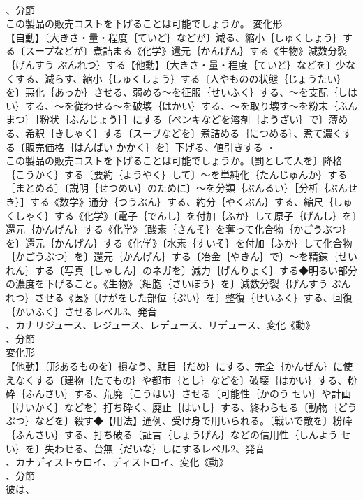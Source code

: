 \documentclass[8pt]{extreport}
\begin{document}
\begin{CJK}{UTF8}{min}
\\	、分節
\\	この製品の販売コストを下げることは可能でしょうか。	変化形 
\\	【自動】〔大きさ・量・程度｛ていど｝などが〕減る、縮小｛しゅくしょう｝する〔スープなどが〕煮詰まる《化学》還元｛かんげん｝する《生物》減数分裂｛げんすう ぶんれつ｝する【他動】〔大きさ・量・程度｛ていど｝などを〕少なくする、減らす、縮小｛しゅくしょう｝する〔人やものの状態｛じょうたい｝を〕悪化｛あっか｝させる、弱める～を征服｛せいふく｝する、～を支配｛しはい｝する、～を従わせる～を破壊｛はかい｝する、～を取り壊す～を粉末｛ふんまつ｝［粉状｛ふんじょう｝］にする〔ペンキなどを溶剤｛ようざい｝で〕薄める、希釈｛きしゃく｝する〔スープなどを〕煮詰める｛につめる｝、煮て濃くする〔販売価格｛はんばい かかく｝を〕下げる、値引きする ・
\\	この製品の販売コストを下げることは可能でしょうか。〔罰として人を〕降格｛こうかく｝する〔要約｛ようやく｝して〕～を単純化｛たんじゅんか｝する［まとめる］〔説明｛せつめい｝のために〕～を分類｛ぶんるい｝［分析｛ぶんせき｝］する《数学》通分｛つうぶん｝する、約分｛やくぶん｝する、縮尺｛しゅくしゃく｝する《化学》〔電子｛でんし｝を付加｛ふか｝して原子｛げんし｝を〕還元｛かんげん｝する《化学》〔酸素｛さんそ｝を奪って化合物｛かごうぶつ｝を〕還元｛かんげん｝する《化学》〔水素｛すいそ｝を付加｛ふか｝して化合物｛かごうぶつ｝を〕還元｛かんげん｝する〔冶金｛やきん｝で〕～を精錬｛せいれん｝する〔写真｛しゃしん｝のネガを〕減力｛げんりょく｝する◆明るい部分の濃度を下げること。《生物》〔細胞｛さいぼう｝を〕減数分裂｛げんすう ぶんれつ｝させる《医》〔けがをした部位｛ぶい｝を〕整復｛せいふく｝する、回復｛かいふく｝させるレベル3、発音
\\	、カナリジュース、レジュース、レデュース、リデュース、変化《動》
\\	、分節
\\	変化形 
\\	【他動】〔形あるものを〕損なう、駄目｛だめ｝にする、完全｛かんぜん｝に使えなくする〔建物｛たてもの｝や都市｛とし｝などを〕破壊｛はかい｝する、粉砕｛ふんさい｝する、荒廃｛こうはい｝させる〔可能性｛かのう せい｝や計画｛けいかく｝などを〕打ち砕く、廃止｛はいし｝する、終わらせる〔動物｛どうぶつ｝などを〕殺す◆【用法】通例、受け身で用いられる。〔戦いで敵を〕粉砕｛ふんさい｝する、打ち破る〔証言｛しょうげん｝などの信用性｛しんよう せい｝を〕失わせる、台無｛だいな｝しにするレベル2、発音
\\	、カナディストゥロイ、ディストロイ、変化《動》
\\	、分節
\\	彼は、

\end{CJK}
\end{document}
